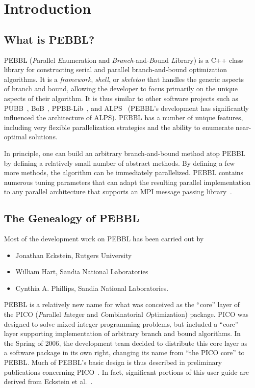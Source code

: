 \section{Introduction}


\subsection{What is PEBBL?}

PEBBL (\emph{P}arallel \emph{E}numeration and
\emph{Branch}-and-\emph{B}ound \emph{L}ibrary) is a C++ class library
for constructing serial and parallel branch-and-bound optimization
algorithms.  It is a \emph{framework}, \emph{shell}, or
\emph{skeleton} that handles the generic aspects of branch and bound,
allowing the developer to focus primarily on the unique aspects of
their algorithm.  It is thus similar to other software projects such
as PUBB~\cite{SHH95,SHH97}, BoB~\cite{bob95}, PPBB-Lib~\cite{PPBB96},
and ALPS~\cite{RLS04} (PEBBL's development has significantly
influenced the architecture of ALPS).  PEBBL has a number of unique
features, including very flexible parallelization strategies and the
ability to enumerate near-optimal solutions.

In principle, one can build an arbitrary branch-and-bound method atop
PEBBL by defining a relatively small number of abstract methods.  By
defining a few more methods, the algorithm can be immediately
parallelized.  PEBBL contains numerous tuning parameters that can
adapt the resulting parallel implementation to any parallel
architecture that supports an MPI message passing
library~\cite{SOHWD96}.


\subsection{The Genealogy of PEBBL}

Most of the development work on PEBBL has been carried out by
\begin{itemize}
\item Jonathan Eckstein, Rutgers University
\item William Hart, Sandia National Laboratories
\item Cynthia A. Phillips, Sandia National Laboratories.
\end{itemize}
PEBBL is a relatively new name for what was conceived as the ``core''
layer of the PICO (\emph{P}arallel \emph{I}nteger and
\emph{C}ombinatorial \emph{O}ptimization) package.  PICO was designed
to solve mixed integer programming problems, but included a ``core''
layer supporting implementation of arbitrary branch and bound
algorithms.  In the Spring of 2006, the development team decided to
distribute this core layer as a software package in its own right,
changing its name from ``the PICO core'' to PEBBL.  Much of PEBBL's
basic design is thus described in preliminary
publications concerning PICO~\cite{EHP97,EPH00,EPH00a}.  In fact,
significant portions of this user guide are derived
from Eckstein et al.~\cite{EPH00a,EPH00}.

